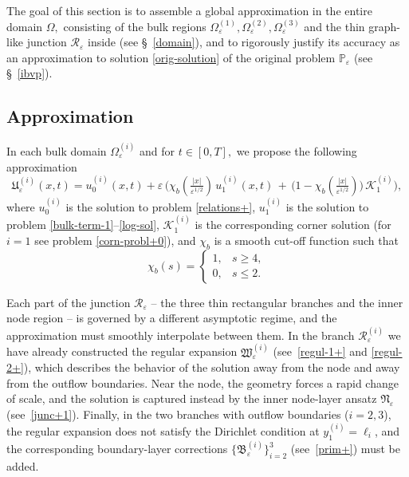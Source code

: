 \documentclass[reqno]{amsart}            %
\numberwithin{equation}{section}
\begin{document}
	The goal of this section is to assemble a global approximation in the entire 
	domain $\Omega,$ consisting of the bulk regions \(\Omega_\varepsilon^{(1)},\Omega_\varepsilon^{(2)},\Omega_\varepsilon^{(3)}\) and
	the thin graph-like junction $\mathcal{R}_\varepsilon$ inside (see \S~\ref{domain}), and to rigorously justify  its accuracy as an approximation to solution \eqref{orig-solution} of the original problem $\mathbb{P}_\varepsilon$ (see \S~\ref{ibvp}).
	
	\subsection{Approximation} In each bulk domain $\Omega_\varepsilon^{(i)}$ and for $t\in [0,T],$ we propose the following approximation 
	\begin{equation}\label{approxim-3-1}
		\mathfrak{U}_\varepsilon^{(i)}(x,t) = u_0^{(i)}(x,t) + \varepsilon \, \Big(\chi_b(\tfrac{|x|}{\varepsilon^{1/2}}) \, u_1^{(i)}(x,t) \, + \,  \big(1 - \chi_b(\tfrac{|x|}{\varepsilon^{1/2}}) \big)\, \mathcal{K}^{(i)}_1 \Big), 
	\end{equation}
	where $u_0^{(i)}$ is the solution to problem \eqref{relations+}, $u_1^{(i)}$ is the solution to problem \eqref{bulk-term-1}--\eqref{log-sol}, $\mathcal{K}^{(i)}_1$ is the corresponding corner solution (for $i=1$ see problem \eqref{corn-probl+0}), and $\chi_b$ is a smooth cut-off function such that
	\begin{equation}\label{cut-off_function-d}
		\chi_b(s)=
		\begin{cases}
			1, & s \ge 4,
			\\[2pt]
			0, & s \le 2.
		\end{cases}
	\end{equation}
	
	Each part of the junction $\mathcal{R}_\varepsilon$ -- the three thin 
	rectangular branches and the inner node region -- is governed by a different 
	asymptotic regime, and the approximation must smoothly interpolate between them.
	In the branch $\mathcal{R}^{(i)}_\varepsilon$ we have already constructed the 
	regular expansion $\mathfrak{W}^{(i)}_\varepsilon$ 
	(see~\eqref{regul-1+} and \eqref{regul-2+}), which describes the behavior of the solution 
	away from the node and away from the outflow boundaries.  
	Near the node, the geometry forces a rapid change of scale, and the solution is 
	captured instead by the inner node-layer ansatz $\mathfrak{N}_\varepsilon$ 
	(see~\eqref{junc+1}).  
	Finally, in the two branches with outflow boundaries ($i=2,3$), the regular 
	expansion does not satisfy the Dirichlet condition at $y^{(i)}_1=\ell_i$, and the 
	corresponding boundary-layer corrections $\{\mathfrak{B}^{(i)}_\varepsilon\}_{i=2}^3$ 
	(see~\eqref{prim+}) must be added.
	
\end{document}
